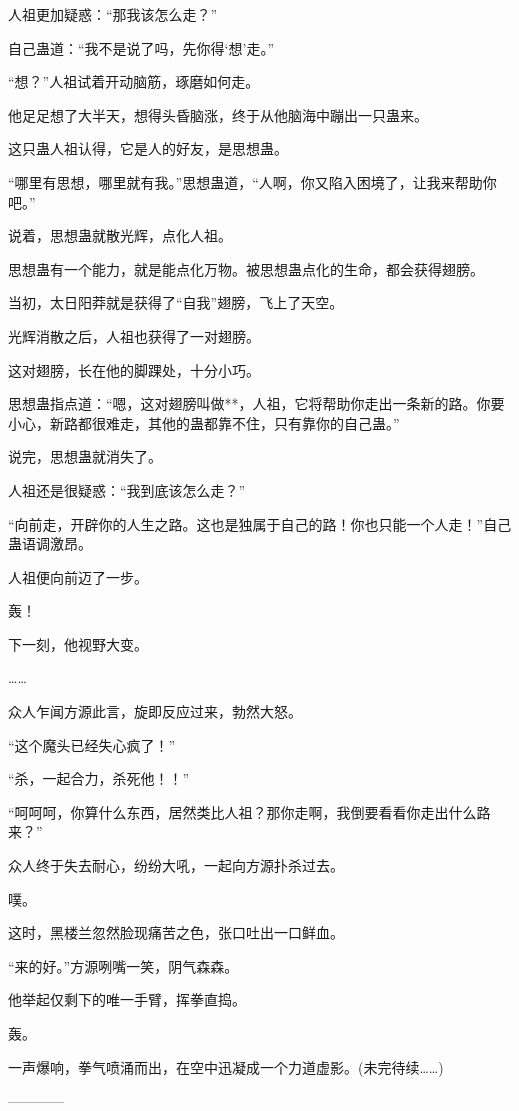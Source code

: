 \begin{this_body}
人祖更加疑惑：“那我该怎么走？”

自己蛊道：“我不是说了吗，先你得‘想’走。”

“想？”人祖试着开动脑筋，琢磨如何走。

他足足想了大半天，想得头昏脑涨，终于从他脑海中蹦出一只蛊来。

这只蛊人祖认得，它是人的好友，是思想蛊。

“哪里有思想，哪里就有我。”思想蛊道，“人啊，你又陷入困境了，让我来帮助你吧。”

说着，思想蛊就散光辉，点化人祖。

思想蛊有一个能力，就是能点化万物。被思想蛊点化的生命，都会获得翅膀。

当初，太日阳莽就是获得了“自我”翅膀，飞上了天空。

光辉消散之后，人祖也获得了一对翅膀。

这对翅膀，长在他的脚踝处，十分小巧。

思想蛊指点道：“嗯，这对翅膀叫做**，人祖，它将帮助你走出一条新的路。你要小心，新路都很难走，其他的蛊都靠不住，只有靠你的自己蛊。”

说完，思想蛊就消失了。

人祖还是很疑惑：“我到底该怎么走？”

“向前走，开辟你的人生之路。这也是独属于自己的路！你也只能一个人走！”自己蛊语调激昂。

人祖便向前迈了一步。

轰！

下一刻，他视野大变。

……

众人乍闻方源此言，旋即反应过来，勃然大怒。

“这个魔头已经失心疯了！”

“杀，一起合力，杀死他！！”

“呵呵呵，你算什么东西，居然类比人祖？那你走啊，我倒要看看你走出什么路来？”

众人终于失去耐心，纷纷大吼，一起向方源扑杀过去。

噗。

这时，黑楼兰忽然脸现痛苦之色，张口吐出一口鲜血。

“来的好。”方源咧嘴一笑，阴气森森。

他举起仅剩下的唯一手臂，挥拳直捣。

轰。

一声爆响，拳气喷涌而出，在空中迅凝成一个力道虚影。(未完待续……)

------------

\end{this_body}

